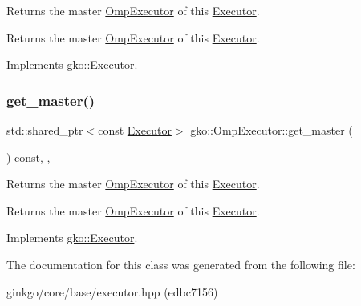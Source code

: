 Returns the master \hyperlink{classgko_1_1OmpExecutor}{Omp\+Executor} of this \hyperlink{classgko_1_1Executor}{Executor}. 

\begin{DoxyReturn}{Returns}
the master \hyperlink{classgko_1_1OmpExecutor}{Omp\+Executor} of this \hyperlink{classgko_1_1Executor}{Executor}. 
\end{DoxyReturn}


Implements \hyperlink{classgko_1_1Executor_acaec4f999d52fc71e5e5a3d3ad93609c}{gko\+::\+Executor}.

\mbox{\label{classgko_1_1OmpExecutor_ab297a7eba78463784d4d2ca08b03c675}} 
\subsubsection{\texorpdfstring{get\+\_\+master()}{get\_master()}\hspace{0.1cm}{\footnotesize\ttfamily [2/2]}}
{\footnotesize\ttfamily std\+::shared\+\_\+ptr$<$const \hyperlink{classgko_1_1Executor}{Executor}$>$ gko\+::\+Omp\+Executor\+::get\+\_\+master (\begin{DoxyParamCaption}{ }\end{DoxyParamCaption}) const\hspace{0.3cm}{\ttfamily [override]}, {\ttfamily [virtual]}, {\ttfamily [noexcept]}}



Returns the master \hyperlink{classgko_1_1OmpExecutor}{Omp\+Executor} of this \hyperlink{classgko_1_1Executor}{Executor}. 

\begin{DoxyReturn}{Returns}
the master \hyperlink{classgko_1_1OmpExecutor}{Omp\+Executor} of this \hyperlink{classgko_1_1Executor}{Executor}. 
\end{DoxyReturn}


Implements \hyperlink{classgko_1_1Executor_a261386e439c8daa6e0d95dc331b9bfeb}{gko\+::\+Executor}.



The documentation for this class was generated from the following file\+:\begin{DoxyCompactItemize}
\item 
ginkgo/core/base/executor.\+hpp (edbc7156)\end{DoxyCompactItemize}
